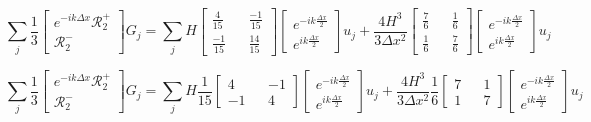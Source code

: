 \documentclass[12pt]{article}
\begin{document}
\begin{equation}
\sum _j\frac{1}{3} \begin{bmatrix} e^{-ik\Delta x}\mathcal{R}^+_2 \\\mathcal{R}^-_2  \end{bmatrix} G_j=  \sum_j H \begin{bmatrix} \frac{4}{15}  && \frac{-1}{15}  \\\frac{-1}{15} && \frac{14}{15}   \end{bmatrix} \begin{bmatrix} e^{-ik\frac{\Delta x}{2}}  \\e^{ik\frac{\Delta x}{2}}   \end{bmatrix} u_j  + \frac{4H^3}{3\Delta x^2} \begin{bmatrix} \frac{7}{6}  && \frac{1}{6}  \\\frac{1}{6} && \frac{7}{6}   \end{bmatrix}\begin{bmatrix} e^{-ik\frac{\Delta x}{2}}  \\e^{ik\frac{\Delta x}{2}}   \end{bmatrix} u_j
\end{equation}

\begin{equation}
\sum _j\frac{1}{3} \begin{bmatrix} e^{-ik\Delta x}\mathcal{R}^+_2 \\\mathcal{R}^-_2  \end{bmatrix} G_j=  \sum_j H \frac{1}{15}  \begin{bmatrix} 4  && -1 \\-1 && 4   \end{bmatrix} \begin{bmatrix} e^{-ik\frac{\Delta x}{2}}  \\e^{ik\frac{\Delta x}{2}}   \end{bmatrix} u_j  + \frac{4H^3}{3\Delta x^2} \frac{1}{6}  \begin{bmatrix} 7  && 1  \\1 && 7   \end{bmatrix}\begin{bmatrix} e^{-ik\frac{\Delta x}{2}}  \\e^{ik\frac{\Delta x}{2}}   \end{bmatrix} u_j
\end{equation}
\end{document}
